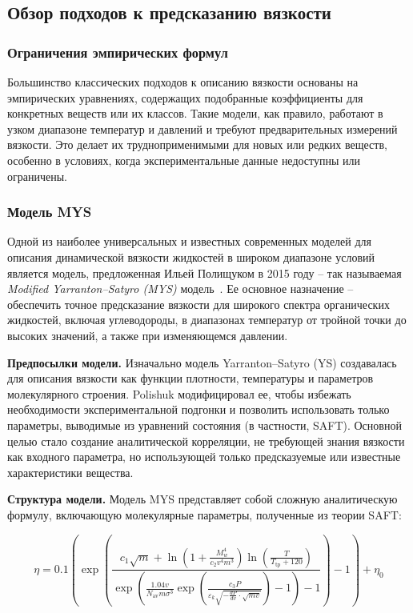 \documentclass[a4paper,12pt]{article}
\begin{document}
  \subsection{Обзор подходов к предсказанию вязкости}

    \subsubsection{Ограничения эмпирических формул}
      Большинство классических подходов к описанию вязкости основаны на эмпирических уравнениях, содержащих подобранные коэффициенты для конкретных веществ или их классов. Такие модели, как правило, работают в узком диапазоне температур и давлений и требуют предварительных измерений вязкости. Это делает их трудноприменимыми для новых или редких веществ, особенно в условиях, когда экспериментальные данные недоступны или ограничены. 

    \subsubsection{Модель MYS}

      Одной из наиболее универсальных и известных современных моделей для описания динамической вязкости жидкостей в широком диапазоне условий является модель, предложенная Ильей Полищуком в 2015 году -- так называемая \textit{Modified Yarranton–Satyro (MYS)} модель~\cite{polishuk2015viscosity}. Ее основное назначение -- обеспечить точное предсказание вязкости для широкого спектра органических жидкостей, включая углеводороды, в диапазонах температур от тройной точки до высоких значений, а также при изменяющемся давлении.

      \textbf{Предпосылки модели.}  
      Изначально модель Yarranton–Satyro (YS) создавалась для описания вязкости как функции плотности, температуры и параметров молекулярного строения. Polishuk модифицировал ее, чтобы избежать необходимости экспериментальной подгонки и позволить использовать только параметры, выводимые из уравнений состояния (в частности, SAFT). Основной целью стало создание аналитической корреляции, не требующей знания вязкости как входного параметра, но использующей только предсказуемые или известные характеристики вещества.
      
      \textbf{Структура модели.}  
      Модель MYS представляет собой сложную аналитическую формулу, включающую молекулярные параметры, полученные из теории SAFT:
      
      \begin{equation}
        \eta = 0.1 \left( \exp \left( \frac{c_1 \sqrt{m} + \ln \left( 1 + \frac{M_w^4}{c_2 v^4 m^3} \right) \ln \left( \frac{T}{T_{\text{tp}} + 120} \right)}{
        \exp \left( \frac{1.04 v}{N_{\text{av}} m \sigma^3} \exp \left( \frac{c_3 P}{\varepsilon_k \sqrt{-\frac{dP}{dv} \cdot \sqrt{m v}}} \right) - 1 \right) - 1} 
        \right) - 1 \right) + \eta_0
        \label{eq:mys}
      \end{equation}
      
\end{document}
